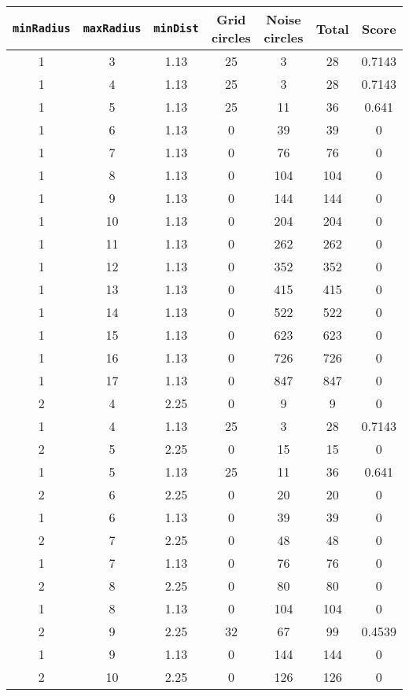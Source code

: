 \documentclass[letterpaper, 12pt]{article}
\begin{document}
\begin{longtable}{|c|c|c|c|c|c|c|}
\hline
\textbf{\texttt{minRadius}} & \textbf{\texttt{maxRadius}} & \textbf{\texttt{minDist}} & \textbf{Grid circles} & \textbf{Noise circles} & \textbf{Total} & \textbf{Score} \\
\hline
1 & 3 & 1.13 & 25 & 3 & 28 & 0.7143 \\
\hline
1 & 4 & 1.13 & 25 & 3 & 28 & 0.7143 \\
\hline
1 & 5 & 1.13 & 25 & 11 & 36 & 0.641 \\
\hline
1 & 6 & 1.13 & 0 & 39 & 39 & 0 \\
\hline
1 & 7 & 1.13 & 0 & 76 & 76 & 0 \\
\hline
1 & 8 & 1.13 & 0 & 104 & 104 & 0 \\
\hline
1 & 9 & 1.13 & 0 & 144 & 144 & 0 \\
\hline
1 & 10 & 1.13 & 0 & 204 & 204 & 0 \\
\hline
1 & 11 & 1.13 & 0 & 262 & 262 & 0 \\
\hline
1 & 12 & 1.13 & 0 & 352 & 352 & 0 \\
\hline
1 & 13 & 1.13 & 0 & 415 & 415 & 0 \\
\hline
1 & 14 & 1.13 & 0 & 522 & 522 & 0 \\
\hline
1 & 15 & 1.13 & 0 & 623 & 623 & 0 \\
\hline
1 & 16 & 1.13 & 0 & 726 & 726 & 0 \\
\hline
1 & 17 & 1.13 & 0 & 847 & 847 & 0 \\
\hline
2 & 4 & 2.25 & 0 & 9 & 9 & 0 \\
\hline
1 & 4 & 1.13 & 25 & 3 & 28 & 0.7143 \\
\hline
2 & 5 & 2.25 & 0 & 15 & 15 & 0 \\
\hline
1 & 5 & 1.13 & 25 & 11 & 36 & 0.641 \\
\hline
2 & 6 & 2.25 & 0 & 20 & 20 & 0 \\
\hline
1 & 6 & 1.13 & 0 & 39 & 39 & 0 \\
\hline
2 & 7 & 2.25 & 0 & 48 & 48 & 0 \\
\hline
1 & 7 & 1.13 & 0 & 76 & 76 & 0 \\
\hline
2 & 8 & 2.25 & 0 & 80 & 80 & 0 \\
\hline
1 & 8 & 1.13 & 0 & 104 & 104 & 0 \\
\hline
2 & 9 & 2.25 & 32 & 67 & 99 & 0.4539 \\
\hline
1 & 9 & 1.13 & 0 & 144 & 144 & 0 \\
\hline
2 & 10 & 2.25 & 0 & 126 & 126 & 0 \\

\end{longtable}
\end{document}
